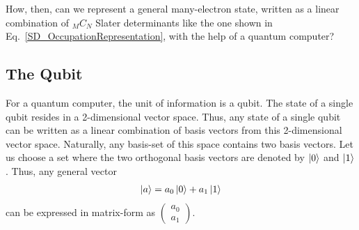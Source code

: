 \documentclass[12pt,oneside]{book}
\begin{document}


How, then, can we represent a general many-electron state, written as a linear combination of $_MC_N$ Slater determinants like the one shown in Eq.~\ref{SD_OccupationRepresentation}, with the help of a quantum computer? %




    
    

\subsection*{The Qubit}

For a quantum computer, the unit of information is a qubit. The state of a single qubit resides in a 2-dimensional vector space. Thus, any state of a single qubit can be written as a linear combination of basis vectors from this 2-dimensional vector space. Naturally, any basis-set of this space contains two basis vectors. Let us choose a set where the two orthogonal basis vectors are denoted by $\ket{0}$ and $\ket{1}$. Thus, any general vector 
\begin{align}\label{Eq1}
    \ket{a}=a_0\ket{0}+a_1\ket{1}
\end{align}
can be expressed in matrix-form as $\begin{pmatrix}
        a_0\\
        a_1
    \end{pmatrix}$.
\end{document}
